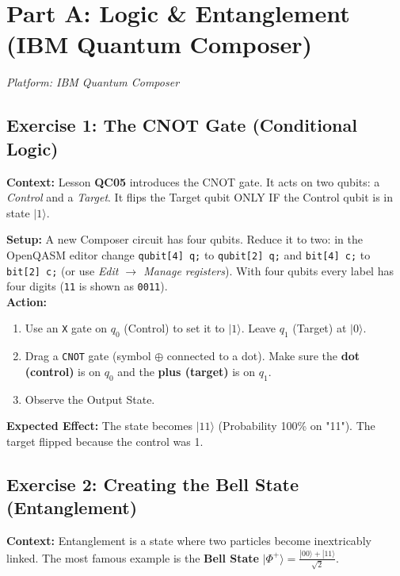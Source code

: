 \documentclass[a4paper,11pt]{article}
\begin{document}
\section{Part A: Logic \& Entanglement (IBM Quantum Composer)}
\textit{Platform: IBM Quantum Composer}

\subsection{Exercise 1: The CNOT Gate (Conditional Logic)}
\textbf{Context:} Lesson \textbf{QC05} introduces the CNOT gate. It acts on two qubits: a \textit{Control} and a \textit{Target}. It flips the Target qubit ONLY IF the Control qubit is in state $|1\rangle$.

\begin{studentbox}
\textbf{Setup:} A new Composer circuit has four qubits. Reduce it to two: in the OpenQASM editor change \texttt{qubit[4] q;} to \texttt{qubit[2] q;} and \texttt{bit[4] c;} to \texttt{bit[2] c;} (or use \textit{Edit $\rightarrow$ Manage registers}). With four qubits every label has four digits (\texttt{11} is shown as \texttt{0011}).\\
\textbf{Action:}
\begin{enumerate}
    \item Use an \texttt{X} gate on $q_0$ (Control) to set it to $|1\rangle$. Leave $q_1$ (Target) at $|0\rangle$.
    \item Drag a \texttt{CNOT} gate (symbol $\oplus$ connected to a dot). Make sure the \textbf{dot (control)} is on $q_0$ and the \textbf{plus (target)} is on $q_1$.
    \item Observe the Output State.
\end{enumerate}
\textbf{Expected Effect:}
The state becomes $|11\rangle$ (Probability 100\% on "11"). The target flipped because the control was 1.
\end{studentbox}

\subsection{Exercise 2: Creating the Bell State (Entanglement)}
\textbf{Context:} Entanglement is a state where two particles become inextricably linked. The most famous example is the \textbf{Bell State} $|\Phi^+\rangle = \frac{|00\rangle + |11\rangle}{\sqrt{2}}$.
\end{document}
